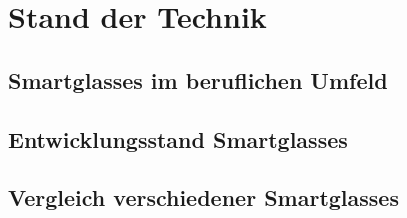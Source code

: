 \chapter{Stand der Technik}
\section{Smartglasses im beruflichen Umfeld}
\section{Entwicklungsstand Smartglasses}
\section{Vergleich verschiedener Smartglasses}